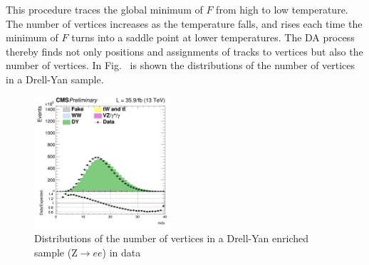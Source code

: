 This procedure traces the global minimum of $F$ from high to low temperature.
The number of vertices increases as the temperature falls, and rises each time the minimum of $F$ turns into a saddle point at lower temperatures. 
The DA process thereby finds not only positions and assignments of tracks to vertices but also the number of vertices.
In Fig.~\label{Fig:pu} is shown the distributions of the number of vertices in a Drell-Yan sample.
\begin{figure}[htbp]
\centering
\includegraphics[width=0.45\textwidth]{../AN/Figs/nvertices.png}
\caption{
    Distributions of the number of vertices in a Drell-Yan enriched sample
    (Z$\rightarrow{}ee$) in
    data}
    \label{Fig:pu}
\end{figure}




